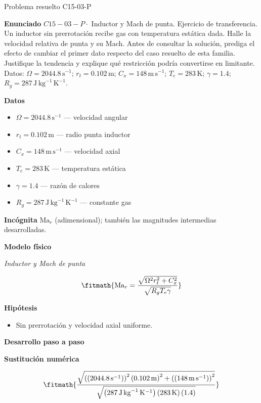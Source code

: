 \documentclass[10pt,openany]{book}
\begin{document}
\begin{studiumworked}{Problema resuelto C15-03-P}


\noindent\textbf{Enunciado}
\(C15-03-P \cdot\) Inductor y Mach de punta. Ejercicio de transferencia. Un inductor sin prerrotación recibe gas con temperatura estática dada. Halle la velocidad relativa de punta y su Mach. Antes de consultar la solución, prediga el efecto de cambiar el primer dato respecto del caso resuelto de esta familia. Justifique la tendencia y explique qué restricción podría convertirse en limitante. Datos: \(\Omega=2044.8\, \mathrm{s}^{-1}\); \(r_t=0.102\, \mathrm{m}\); \(C_x=148\, \mathrm{m}\,\mathrm{s}^{-1}\); \(T_e=283\, \mathrm{K}\); \(\gamma=1.4\); \(R_g=287\, \mathrm{J}\,\mathrm{kg}^{-1}\,\mathrm{K}^{-1}\).

\noindent\textbf{Datos}
\begin{itemize}
\item $\Omega = 2044.8\,\mathrm{s}^{-1}$ — velocidad angular
\item $r_t = 0.102\,\mathrm{m}$ — radio punta inductor
\item $C_x = 148\,\mathrm{m}\,\mathrm{s}^{-1}$ — velocidad axial
\item $T_e = 283\,\mathrm{K}$ — temperatura estática
\item $\gamma = 1.4$ — razón de calores
\item $R_g = 287\,\mathrm{J}\,\mathrm{kg}^{-1}\,\mathrm{K}^{-1}$ — constante gas
\end{itemize}

\noindent\textbf{Incógnita}
$\mathrm{Ma}_r$ (adimensional); también las magnitudes intermedias desarrolladas.

\noindent\textbf{Modelo físico}

\noindent\textit{Inductor y Mach de punta}

\[
\fitmath{\mathrm{Ma}_r=\frac{\sqrt{\Omega^{2} r_t^{2} + C_x^{2}}}{\sqrt{R_g T_e \gamma}}}
\]

\noindent\textbf{Hipótesis}
\begin{itemize}
\item Sin prerrotación y velocidad axial uniforme.
\end{itemize}

\noindent\textbf{Desarrollo paso a paso}



\noindent\textbf{Sustitución numérica}

\[
\fitmath{\frac{\sqrt{\left(\left(2044.8\,\mathrm{s}^{-1}\right)\right)^{2} \left(0.102\,\mathrm{m}\right)^{2} + \left(\left(148\,\mathrm{m}\,\mathrm{s}^{-1}\right)\right)^{2}}}{\sqrt{\left(287\,\mathrm{J}\,\mathrm{kg}^{-1}\,\mathrm{K}^{-1}\right) \left(283\,\mathrm{K}\right) \left(1.4\right)}}}
\]


\end{studiumworked}
\end{document}
